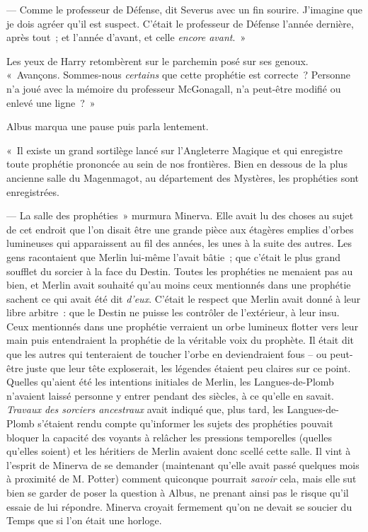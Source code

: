 --- Comme le professeur de Défense, dit Severus avec un fin sourire.
J'imagine que je dois agréer qu'il est suspect.
C'était le professeur de Défense l'année dernière, après tout~; et l'année d'avant, et celle \emph{encore avant}.~»

Les yeux de Harry retombèrent sur le parchemin posé sur ses genoux.
«~Avançons.
Sommes-nous \emph{certains} que cette prophétie est correcte~?
Personne n'a joué avec la mémoire du professeur McGonagall, n'a peut-être modifié ou enlevé une ligne~?~»

Albus marqua une pause puis parla lentement.

«~Il existe un grand sortilège lancé sur l'Angleterre Magique et qui enregistre toute prophétie prononcée au sein de nos frontières.
Bien en dessous de la plus ancienne salle du Magenmagot, au département des Mystères, les prophéties sont enregistrées.

--- La salle des prophéties~» murmura Minerva.
Elle avait lu des choses au sujet de cet endroit que l'on disait être une grande pièce aux étagères emplies d'orbes lumineuses qui apparaissent au fil des années, les unes à la suite des autres.
Les gens racontaient que Merlin lui-même l'avait bâtie~; que c'était le plus grand soufflet du sorcier à la face du Destin.
Toutes les prophéties ne menaient pas au bien, et Merlin avait souhaité qu'au moins ceux mentionnés dans une prophétie sachent ce qui avait été dit \emph{d'eux}.
C'était le respect que Merlin avait donné à leur libre arbitre~: que le Destin ne puisse les contrôler de l'extérieur, à leur insu.
Ceux mentionnés dans une prophétie verraient un orbe lumineux flotter vers leur main puis entendraient la prophétie de la véritable voix du prophète.
Il était dit que les autres qui tenteraient de toucher l'orbe en deviendraient fous -- ou peut-être juste que leur tête exploserait, les légendes étaient peu claires sur ce point.
Quelles qu'aient été les intentions initiales de Merlin, les Langues-de-Plomb n'avaient laissé personne y entrer pendant des siècles, à ce qu'elle en savait.
\emph{Travaux des sorciers ancestraux} avait indiqué que, plus tard, les Langues-de-Plomb s'étaient rendu compte qu'informer les sujets des prophéties pouvait bloquer la capacité des voyants à relâcher les pressions temporelles (quelles qu'elles soient) et les héritiers de Merlin avaient donc scellé cette salle.
Il vint à l'esprit de Minerva de se demander (maintenant qu'elle avait passé quelques mois à proximité de M. Potter) comment quiconque pourrait \emph{savoir} cela, mais elle sut bien se garder de poser la question à Albus, ne prenant ainsi pas le risque qu'il essaie de lui répondre.
Minerva croyait fermement qu'on ne devait se soucier du Temps que si l'on était une horloge.

